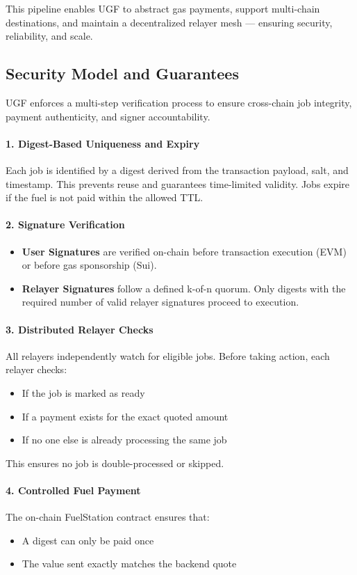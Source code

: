 \documentclass{article}
\begin{document}
This pipeline enables UGF to abstract gas payments, support multi-chain destinations, and maintain a decentralized relayer mesh — ensuring security, reliability, and scale.

\subsection{Security Model and Guarantees}

UGF enforces a multi-step verification process to ensure cross-chain job integrity, payment authenticity, and signer accountability.

\paragraph{1. Digest-Based Uniqueness and Expiry}
Each job is identified by a digest derived from the transaction payload, salt, and timestamp. This prevents reuse and guarantees time-limited validity. Jobs expire if the fuel is not paid within the allowed TTL.

\paragraph{2. Signature Verification}
\begin{itemize}
  \item \textbf{User Signatures} are verified on-chain before transaction execution (EVM) or before gas sponsorship (Sui).
  \item \textbf{Relayer Signatures} follow a defined k-of-n quorum. Only digests with the required number of valid relayer signatures proceed to execution.
\end{itemize}

\paragraph{3. Distributed Relayer Checks}
All relayers independently watch for eligible jobs. Before taking action, each relayer checks:
\begin{itemize}
  \item If the job is marked as ready
  \item If a payment exists for the exact quoted amount
  \item If no one else is already processing the same job
\end{itemize}
This ensures no job is double-processed or skipped.

\paragraph{4. Controlled Fuel Payment}
The on-chain FuelStation contract ensures that:
\begin{itemize}
  \item A digest can only be paid once
  \item The value sent exactly matches the backend quote
\end{itemize}
\end{document}
